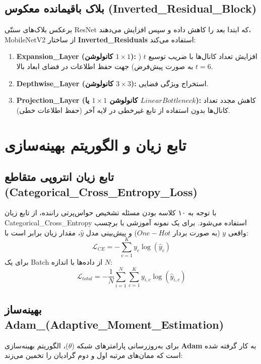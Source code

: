\documentclass{report}
\begin{document}
 	\subsection{بلاک باقیمانده معکوس (Inverted\_Residual\_Block)}
 	برعکس بلاک‌های سنتّی ResNet که ابتدا بعد را کاهش داده و سپس افزایش می‌دهند، MobileNetV2 از ساختار \textbf{Inverted\_Residuals} استفاده می‌کند:
 	\begin{enumerate}
 		\item \textbf{Expansion\_Layer (کانولوشن $1 \times 1$):} افزایش تعداد کانال‌ها با ضریب توسيع $t$ ($t=6$ به صورت پیش‌فرض) جهت حفظ اطلاعات در فضای ابعاد بالا.
 		\item \textbf{Depthwise\_Layer (کانولوشن $3 \times 3$):} استخراج ویژگی فضایی.
 		\item \textbf{Projection\_Layer (کانولوشن $1 \times 1$ یا $Linear Bottleneck$):} کاهش مجدد تعداد کانال‌ها بدون استفاده از تابع غیرخطی در لایه آخر (حفظ اطلاعات خطی).
 	\end{enumerate}
 	
 	\section{تابع زیان و الگوریتم بهینه‌سازی}
 	
 	\subsection{تابع زیان انتروپی متقاطع (Categorical\_Cross\_Entropy\_Loss)}
 	با توجه به ۱۰ کلاسه بودن مسئله تشخیص حواس‌پرتی راننده، از تابع زیان Categorical\_Cross\_Entropy استفاده می‌شود. برای یک نمونه آموزشی با برچسب واقعی $y$ (به صورت بردار $One-Hot$) و پیش‌بینی مدل $\hat{y}$، مقدار زیان برابر است با:
 	\begin{equation}
 		\mathcal{L}_{CE} = - \sum_{c=1}^{K} y_c \log(\hat{y}_c)
 	\end{equation}
 	برای یک Batch از داده‌ها با اندازه $N$:
 	\begin{equation}
 		\mathcal{L}_{total} = - \frac{1}{N} \sum_{i=1}^{N} \sum_{c=1}^{K} y_{i, c} \log(\hat{y}_{i, c})
 	\end{equation}
 	
 	\subsection{بهینه‌ساز Adam\_(Adaptive\_Moment\_Estimation)}
 	برای به‌روزرسانی پارامترهای شبکه ($\theta$)، الگوریتم بهینه‌سازی \textbf{Adam} به کار گرفته شده است که ممان‌های مرتبه اول و دوم گرادیان را تخمین می‌زند:
 	
\end{document}
